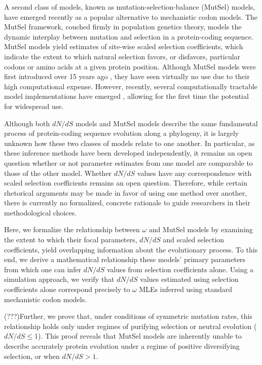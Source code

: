 \documentclass[11pt]{article}
\begin{document}
A second class of models, known as mutation-selection-balance (MutSel) models, have emerged recently as a popular alternative to mechanistic codon models. The MutSel framework, couched firmly in population genetics theory, models the dynamic interplay between mutation and selection in a protein-coding sequence. MutSel models yield estimates of site-wise scaled selection coefficients, which indicate the extent to which natural selection favors, or disfavors, particular codons or amino acids at a given protein position. Although MutSel models were first introduced over 15 years ago \cite{HalpernBruno1998}, they have seen virtually no use due to their high computational expense. However, recently, several computationally tractable model implementations have emerged \cite{RodrigueLartillot2014,Tamurietal2014}, allowing for the first time the potential for widespread use. 


Although both $dN/dS$ models and MutSel models describe the same fundamental process of protein-coding sequence evolution along a phylogeny, it is largely unknown how these two classes of models relate to one another. In particular, as these inference methods have been developed independently, it remains an open question whether or not parameter estimates from one model are comparable to those of the other model. Whether $dN/dS$ values have any correspondence with scaled selection coefficients remains an open question. Therefore, while certain rhetorical arguments may be made in favor of using one method over another, there is currently no formalized, concrete rationale to guide researchers in their methodological choices. 

Here, we formalize the relationship between $\omega$ and MutSel models by examining the extent to which their focal parameters, $dN/dS$ and scaled selection coefficients, yield overlapping information about the evolutionary process. To this end, we derive a mathematical relationship these models' primary parameters from which one can infer $dN/dS$ values from selection coefficients alone. Using a simulation approach, we verify that $dN/dS$ values estimated using selection coefficients alone correspond precisely to $\omega$ MLEs inferred using standard mechanistic codon models. 

(???)Further, we prove that, under conditions of symmetric mutation rates, this relationship holds only under regimes of purifying selection or neutral evolution ($dN/dS \leq 1$). This proof reveals that MutSel models are inherently unable to describe accurately protein evolution under a regime of positive diversifying selection, or when $dN/dS > 1$.
\end{document}
